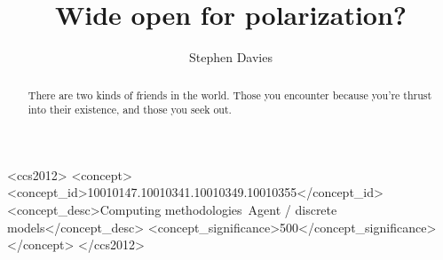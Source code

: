 \documentclass[sigconf]{acmart}
\begin{document}
\title{Wide open for polarization?}


\author{Stephen Davies}

\renewcommand{\shortauthors}{S. Davies}


\begin{abstract}
There are two kinds of friends in the world. Those you encounter because
you're thrust into their existence, and those you seek out.
\end{abstract}

%
%
\begin{CCSXML}
<ccs2012>
<concept>
<concept_id>10010147.10010341.10010349.10010355</concept_id>
<concept_desc>Computing methodologies~Agent / discrete models</concept_desc>
<concept_significance>500</concept_significance>
</concept>
</ccs2012>
\end{CCSXML}





\maketitle



\appendix



\end{document}
